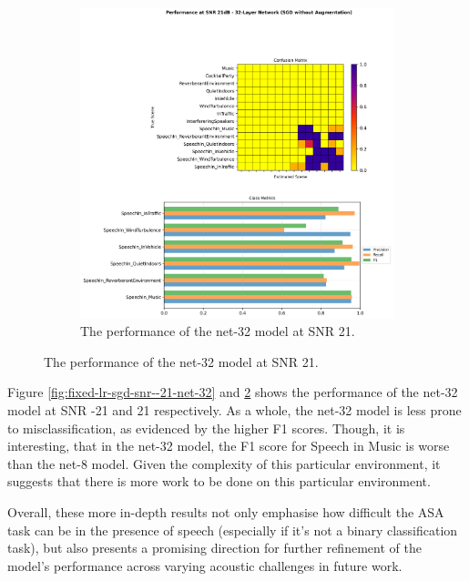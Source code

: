 \documentclass[logo,bsc,singlespacing,parskip,online]{infthesis}
\begin{document}
\begin{figure}[h]
\begin{subfigure}[b]{0.48\textwidth}
      \includegraphics[width=\textwidth]{net-32/FIXED-fixed-lr-sgd/snr_21_performance.png}
      \caption{The performance of the net-32 model at SNR 21.}
      \label{fig:fixed-lr-sgd-snr-21-net-32}
   \end{subfigure}
\end{figure}

Figure \ref{fig:fixed-lr-sgd-snr--21-net-32} and \ref{fig:fixed-lr-sgd-snr-21-net-32} shows 
the performance of the net-32 model at SNR -21 and 21 respectively.
As a whole, the net-32 model is less prone to misclassification, 
as evidenced by the higher F1 scores. Though, it is interesting, that in the 
net-32 model, the F1 score for Speech in Music is worse than the net-8 model.
Given the complexity of this particular environment, it suggests that 
there is more work to be done on this particular environment. 

Overall, these more in-depth results not only emphasise 
how difficult the ASA task can be in the presence of speech (especially 
if it's not a binary classification task), but also 
presents a promising direction for further refinement of the model's performance across varying acoustic challenges
in future work.
\end{document}
